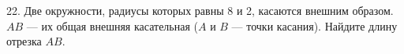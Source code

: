 22. Две окружности, радиусы которых равны 8 и 2, касаются внешним образом. $AB$ --- их общая внешняя касательная ($A$ и $B$ --- точки касания). Найдите длину отрезка $AB.$\\
